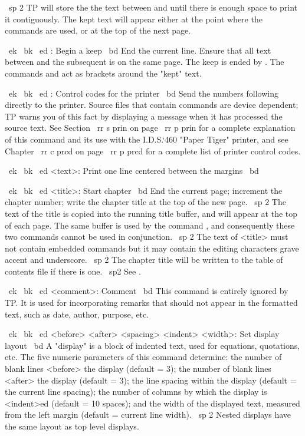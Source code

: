 ~sp 2 TP will store the the text between \BF and \EF until there is
enough space to print it contiguously.
The kept text will appear either at the point
where the commands are used, or at the top of the next page.
 
~ek ~bk ~ed  \BK: Begin a keep
~bd
End the current line.  Ensure that all text between \BK and
the subsequent \EK is on the same page.
The keep is ended by \EK.
The commands \BK and \EK act as brackets around the "kept" text.

~ek ~bk ~ed \CC: Control codes for the printer
~bd
Send the numbers following \CC directly to the printer.
Source files that contain \CC commands are device dependent; TP warns you
of this fact by displaying a message when it has processed the source text.
See Section ~rr s prin on page ~rr p prin for a complete explanation
of this command and its use with the I.D.S.`460 "Paper Tiger" printer,
and see Chapter ~rr c prcd on page ~rr p prcd for a complete list of
printer control codes.

~ek ~bk ~ed \CE <text>: Print one line centered between the margins
~bd

~ek ~bk ~ed \CH <title>: Start chapter
~bd End the current page; increment the chapter number; write the chapter
title at the top of the new page.
~sp 2 The text of the title is copied into the running title buffer, and
will appear at the top of each page.
The same buffer is used by the command \TL, and consequently these
two commands cannot be used in conjunction.
~sp 2 The text of <title> must not contain embedded commands but it may
contain the editing characters grave accent and underscore.
~sp 2 The chapter title will be written to the table of contents
file if there is one.
~sp2 See \TL.

~ek ~bk ~ed \CO <comment>: Comment
~bd
This command is entirely ignored by TP.
It is used for incorporating remarks that should not appear in the
formatted text, such as date, author, purpose, etc.

~ek ~bk ~ed \DL <before> <after> <spacing> <indent> <width>: 
Set display layout
~bd A "display" is a block of indented text, used for equations, quotations,
etc.
The five numeric parameters of this command determine: the number of blank 
lines <before> the display (default = 3); the number of blank lines <after> 
the display (default = 3); the line spacing within the display (default = 
the current line spacing); the number of columns by which the display is 
<indent>ed (default = 10 spaces); and the width of the displayed text, 
measured from the left margin (default = current line width).
~sp 2 Nested displays have the same layout as top level displays.


